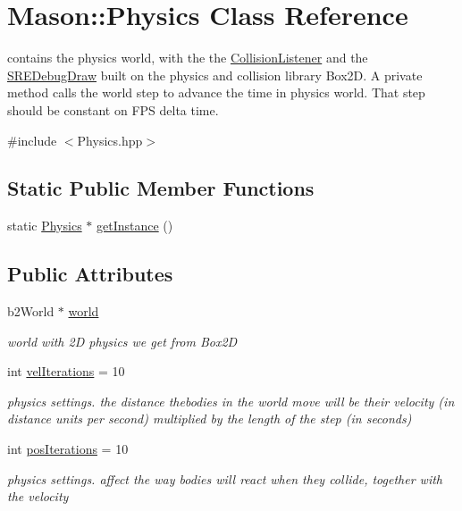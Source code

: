 \hypertarget{class_mason_1_1_physics}{}\section{Mason\+:\+:Physics Class Reference}
\label{class_mason_1_1_physics}


contains the physics world, with the the \hyperlink{class_mason_1_1_collision_listener}{Collision\+Listener} and the \hyperlink{class_mason_1_1_s_r_e_debug_draw}{S\+R\+E\+Debug\+Draw} built on the physics and collision library Box2D. A private method calls the world step to advance the time in physics world. That step should be constant on F\+PS delta time.  




{\ttfamily \#include $<$Physics.\+hpp$>$}

\subsection*{Static Public Member Functions}
\begin{DoxyCompactItemize}
\item 
static \hyperlink{class_mason_1_1_physics}{Physics} $\ast$ \hyperlink{class_mason_1_1_physics_aba5aeb438d394e23ebd74bdc4aa716c2}{get\+Instance} ()
\end{DoxyCompactItemize}
\subsection*{Public Attributes}
\begin{DoxyCompactItemize}
\item 
b2\+World $\ast$ \hyperlink{class_mason_1_1_physics_a76c12a9fcecf8ff84953c1a5841e6f56}{world}
\begin{DoxyCompactList}\small\item\em world with 2D physics we get from Box2D \end{DoxyCompactList}\item 
int \hyperlink{class_mason_1_1_physics_ab93e9c5caf8cb0964ceedc2161fac86d}{vel\+Iterations} = 10
\begin{DoxyCompactList}\small\item\em physics settings. the distance thebodies in the world move will be their velocity (in distance units per second) multiplied by the length of the step (in seconds) \end{DoxyCompactList}\item 
int \hyperlink{class_mason_1_1_physics_a43a4f23b2ee62ad20c3ed54a7c75a468}{pos\+Iterations} = 10
\begin{DoxyCompactList}\small\item\em physics settings. affect the way bodies will react when they collide, together with the velocity \end{DoxyCompactList}\end{DoxyCompactItemize}

